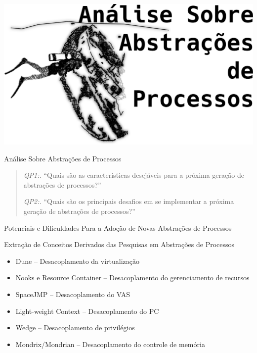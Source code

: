 \documentclass[xcolor={usenames,svgnames,dvipsnames},brazil,english,12pt,aspectratio=149]{beamer}
\begin{document}
\begin{frame}[plain]
  \centering
  \includegraphics[width=\textwidth]{presentation_cap7}
\end{frame}

\begin{frame}{Análise Sobre Abstrações de Processos}
  \begin{quote}
   \item \textit{QP1:.} ``Quais são as características desejáveis para a próxima geração de abstrações de processos?''
   \item \textit{QP2:.} ``Quais são os principais desafios em se implementar a próxima geração de abstrações de processos?''
  \end{quote}
\end{frame}

\begin{frame}{Potenciais e Dificuldades Para a Adoção de Novas Abstrações de Processos}
  
\end{frame}

\begin{frame}{Extração de Conceitos Derivados das Pesquisas em Abstrações de Processos}
  \begin{itemize}
    \item Dune -- Desacoplamento da virtualização
    \item Nooks e Resource Container -- Desacoplamento do gerenciamento de recursos
    \item SpaceJMP -- Desacoplamento do VAS
    \item Light-weight Context -- Desacoplamento do PC
    \item Wedge -- Desacoplamento de privilégios
    \item Mondrix/Mondrian -- Desacoplamento do controle de memória
  \end{itemize}
\end{frame}
\end{document}
